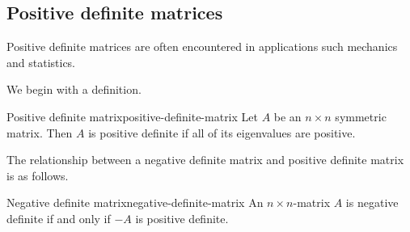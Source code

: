 \subsection{Positive definite matrices}

Positive definite matrices are often encountered in applications such mechanics and statistics.

We begin with a definition.

\begin{definition}{Positive definite matrix}{positive-definite-matrix}
Let $A$ be an $n \times n$ symmetric matrix. Then $A$ is positive definite if all of its eigenvalues are positive.
\end{definition}

The relationship between a negative definite matrix and positive definite matrix is as follows. 

\begin{lemma}{Negative definite matrix}{negative-definite-matrix}
An $n\times n$-matrix $A$ is negative definite if and only if $-A$ is
positive definite.
\end{lemma}



